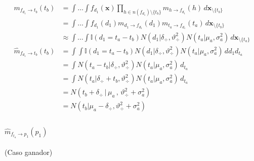 \documentclass[11pt,twoside, spanish]{report} %
\begin{document}
\begin{equation}\label{eq:^m_fd_tb}
	\begin{split}
		m_{f_{d_1} \rightarrow t_b}(t_b) & = \int \dots \int f_{d_1}(\textbf{x}) \prod_{h \in n(f_{d_1}) \setminus \{t_b\} } m_{h \rightarrow f_{d_1}}(h) \, d\textbf{x}_{\setminus \{t_b\}} \\
		& = \int \dots \int f_{d_1}(d_1)  m_{d_1 \rightarrow f_{d_1}}(d_1) m_{t_a \rightarrow f_{d_1}}(t_a) \, d\textbf{x}_{\setminus \{t_b\}} \\
		&\approx  \int \dots \int \mathbb{I}(d_1 = t_a - t_b) N(d_1 | \delta_{\div}, \vartheta_{\div}^2) N(t_a | \mu_a , \sigma_a^2 )  \, d\textbf{x}_{\setminus \{t_a\} } \\
		\widehat{m}_{f_{d_1} \rightarrow t_b}(t_b)  & = \int \int \mathbb{I}(d_1 = t_a - t_b) N(d_1 | \delta_{\div}, \vartheta_{\div}^2) N(t_a | \mu_a , \sigma_a^2 )  \, d{d_1} d_{t_a} \\
		& =\int  N(t_a - t_b | \delta_{\div}, \vartheta_{\div}^2) N(t_a | \mu_a , \sigma_a^2 )  \, d_{t_a} \\
		& = \int  N( t_a | \delta_{\div} + t_b, \vartheta_{\div}^2) N(t_a | \mu_a , \sigma_a^2 )  \, d_{t_a} \\
		& = N(t_b + \delta_{\div} \, | \, \mu_a \, , \, \vartheta_{\div}^2 + \sigma_a^2) \\
		& = N(t_b | \mu_a - \delta_{\div}  ,  \vartheta_{\div}^2 + \sigma_a^2) \\
	\end{split}
\end{equation}

\paragraph{$\widehat{m}_{f_{t_a} \rightarrow p_1}(p_1)$} (Caso ganador)
\end{document}
